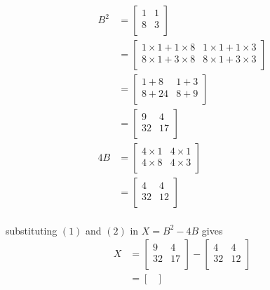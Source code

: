 \documentclass[journal, 11pt,twocolumn]{IEEEtran}
\begin{document}
\begin{align}
   B^2 & = \begin{bmatrix}
   1 & 1\\
   8 & 3\\
\end{bmatrix}
\nonumber\\
          & = \begin{bmatrix}
   1 \times 1 + 1 \times 8 & 1 \times 1 + 1 \times 3\\
   8 \times 1 + 3 \times 8 & 8 \times 1 + 3 \times 3\\
 \end{bmatrix}
 \nonumber\\
          & = \begin{bmatrix}
    1 + 8 & 1 + 3\\
    8 + 24 & 8 + 9\\
   \end{bmatrix}
   \nonumber\\
          & = \begin{bmatrix}
    9 & 4\\
    32 & 17\\
    \end{bmatrix}\\
4B & = \begin{bmatrix}
   4 \times 1 & 4 \times 1\\
   4 \times 8 & 4 \times 3\\
        \end{bmatrix}
        \nonumber\\
        & = \begin{bmatrix}
    4 & 4\\
    32 & 12\\
    \end{bmatrix}
    \end{align}\\  substituting $(1)$ and $(2)$ in $X = B^2 - 4B$ gives\begin{align}
    X & = \begin{bmatrix}
    9 & 4\\
    32 & 17\\
    \end{bmatrix}-\begin{bmatrix}
    4 & 4\\
    32 & 12\\
    \end{bmatrix}\nonumber\\
    & = \begin{bmatrix}

\end{bmatrix}
\end{align}
\end{document}

